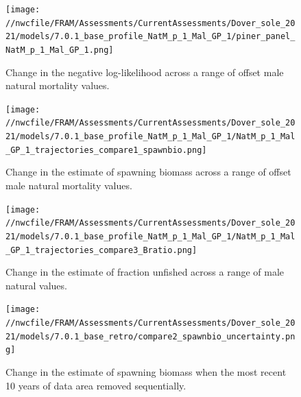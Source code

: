 \documentclass[11pt,
  english,
  a4paper,
]{article}
\begin{document}
\tagmcend\tagstructend


\begin{figure}
\centering
\texttt{[image: //nwcfile/FRAM/Assessments/CurrentAssessments/Dover\_sole\_2021/models/7.0.1\_base\_profile\_NatM\_p\_1\_Mal\_GP\_1/piner\_panel\_NatM\_p\_1\_Mal\_GP\_1.png]}
\caption{Change in the negative log-likelihood across a range of offset male natural mortality values.\label{fig:m-male-profile}}
\end{figure}

\tagmcend\tagstructend


\begin{figure}
\centering
\texttt{[image: //nwcfile/FRAM/Assessments/CurrentAssessments/Dover\_sole\_2021/models/7.0.1\_base\_profile\_NatM\_p\_1\_Mal\_GP\_1/NatM\_p\_1\_Mal\_GP\_1\_trajectories\_compare1\_spawnbio.png]}
\caption{Change in the estimate of spawning biomass across a range of offset male natural mortality values.\label{fig:m-male-ssb}}
\end{figure}

\tagmcend\tagstructend


\begin{figure}
\centering
\texttt{[image: //nwcfile/FRAM/Assessments/CurrentAssessments/Dover\_sole\_2021/models/7.0.1\_base\_profile\_NatM\_p\_1\_Mal\_GP\_1/NatM\_p\_1\_Mal\_GP\_1\_trajectories\_compare3\_Bratio.png]}
\caption{Change in the estimate of fraction unfished across a range of male natural values.\label{fig:m-male-depl}}
\end{figure}

\tagmcend\tagstructend


\begin{figure}
\centering
\texttt{[image: //nwcfile/FRAM/Assessments/CurrentAssessments/Dover\_sole\_2021/models/7.0.1\_base\_retro/compare2\_spawnbio\_uncertainty.png]}
\caption{Change in the estimate of spawning biomass when the most recent 10 years of data area removed sequentially.\label{fig:retro-ssb}}
\end{figure}
\end{document}
